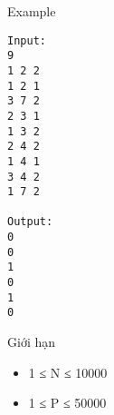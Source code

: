 Example  
\begin{verbatim}
Input:
9
1 2 2 
1 2 1
3 7 2
2 3 1
1 3 2
2 4 2
1 4 1
3 4 2
1 7 2

Output:
0
0
1
0
1
0
\end{verbatim}
   Giới hạn  
\begin{itemize}
	\item     1 ≤ N ≤ 10000   
	\item     1 ≤ P ≤ 50000   
\end{itemize}
